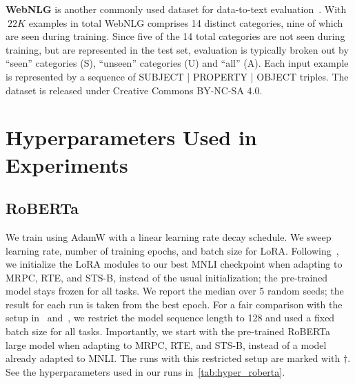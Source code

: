 \documentclass{article} %
\begin{document}
\textbf{WebNLG} 
is another commonly used dataset for data-to-text evaluation~\citep{gardent2017webnlg}. With $~22K$ examples in total WebNLG comprises 14 distinct categories, nine of which are seen during training. Since five of the 14 total categories are not seen during training, but are represented in the test set, evaluation is typically broken out by ``seen'' categories (S),  ``unseen'' categories (U) and ``all'' (A). Each input example is represented by a sequence of SUBJECT | PROPERTY | OBJECT triples.
The dataset is released under Creative Commons BY-NC-SA 4.0.


\section{Hyperparameters Used in Experiments}

\subsection{RoBERTa}
\label{app:hps_roberta}

We train using AdamW with a linear learning rate decay schedule.
We sweep learning rate, number of training epochs, and batch size for LoRA.
Following~\citet{liu2019roberta}, we initialize the LoRA modules to our best MNLI checkpoint when adapting to MRPC, RTE, and STS-B, instead of the usual initialization; the pre-trained model stays frozen for all tasks.
We report the median over 5 random seeds; the result for each run is taken from the best epoch.
For a fair comparison with the setup in~\cite{houlsby_parameter-efficient_2019} and~\cite{pfeiffer2021adapterfusion}, we restrict the model sequence length to 128 and used a fixed batch size for all tasks.
Importantly, we start with the pre-trained RoBERTa large model when adapting to MRPC, RTE, and STS-B, instead of a model already adapted to MNLI.
The runs with this restricted setup are marked with $\dagger$.
See the hyperparameters used in our runs in~\autoref{tab:hyper_roberta}.
\end{document}
